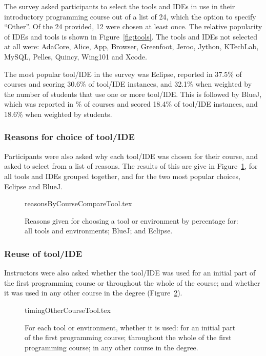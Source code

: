 \documentclass{sig-alternate}
\begin{document}
The survey asked participants to select the tools and IDEs in use in their introductory programming course out of a list of 24, which the option to specify ``Other''. Of the 24 provided, 12 were chosen at least once. The relative popularity of IDEs and tools is shown in Figure~\ref{fig:tools}. The tools and IDEs not selected at all were: AdaCore, Alice, App, Browser, Greenfoot, Jeroo, Jython, KTechLab, MySQL, Pelles, Quincy, Wing101 and Xcode.

The most popular tool/IDE in the survey was Eclipse, reported in 37.5\% of courses and scoring 30.6\% of tool/IDE instances, and 32.1\% when weighted by the number of students that use one or more tool/IDE. This is followed by BlueJ, which was reported in \% of courses and scored 18.4\% of tool/IDE instances, and 18.6\% when weighted by students. 

\subsubsection{Reasons for choice of tool/IDE}
Participants were also asked why each tool/IDE was chosen for their course, and asked to select from a list of reasons. The results of this are give in Figure~\ref{fig:reasonsTools}, for all tools and IDEs grouped together, and for the two most popular choices, Eclipse and BlueJ. 

\begin{figure}[ht]
\begin{center}
{reasonsByCourseCompareTool.tex}
\end{center}
\caption{Reasons given for choosing a tool or environment by percentage for: all tools and environments; BlueJ; and Eclipse.\label{fig:reasonsTools}}
\end{figure}

\subsubsection{Reuse of tool/IDE}
Instructors were also asked whether the tool/IDE was used for an initial part of the first programming course or throughout the whole of the course; and whether it was used in any other course in the degree (Figure~\ref{fig:toolreuse}). 
\begin{figure}
\begin{center}
{timingOtherCourseTool.tex}
\end{center}\vskip-18pt
\caption{For each tool or environment, whether it is used: for an initial part of the first programming course; throughout the whole of the first programming course; in any other course in the degree.\label{fig:toolreuse}}
\end{figure}
\end{document}
